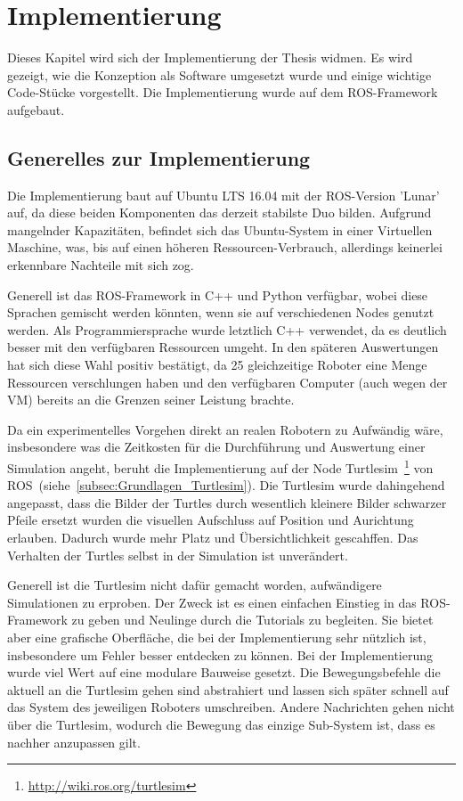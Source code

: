 \chapter{Implementierung}\label{ch:Implementierung}

Dieses Kapitel wird sich der Implementierung der Thesis widmen. Es wird gezeigt, wie die Konzeption als Software umgesetzt wurde und einige wichtige Code-Stücke vorgestellt. Die Implementierung wurde auf dem ROS-Framework aufgebaut.

\section{Generelles zur Implementierung}
Die Implementierung baut auf Ubuntu LTS 16.04 mit der ROS-Version 'Lunar' auf, da diese beiden Komponenten das derzeit stabilste Duo bilden. Aufgrund mangelnder Kapazitäten, befindet sich das Ubuntu-System in einer Virtuellen Maschine, was, bis auf einen höheren Ressourcen-Verbrauch, allerdings keinerlei erkennbare Nachteile mit sich zog.

Generell ist das ROS-Framework in C++ und Python verfügbar, wobei diese Sprachen gemischt werden könnten, wenn sie auf verschiedenen Nodes genutzt werden. Als Programmiersprache wurde letztlich C++ verwendet, da es deutlich besser mit den verfügbaren Ressourcen umgeht. In den späteren Auswertungen hat sich diese Wahl positiv bestätigt, da 25 gleichzeitige Roboter eine Menge Ressourcen verschlungen haben und den verfügbaren Computer (auch wegen der VM) bereits an die Grenzen seiner Leistung brachte.

Da ein experimentelles Vorgehen direkt an realen Robotern zu Aufwändig wäre, insbesondere was die Zeitkosten für die Durchführung und Auswertung einer Simulation angeht, beruht die Implementierung auf der Node Turtlesim~\footnote{\url{http://wiki.ros.org/turtlesim}} von ROS~(siehe~\autoref{subsec:Grundlagen_Turtlesim}). Die Turtlesim wurde dahingehend angepasst, dass die Bilder der Turtles durch wesentlich kleinere Bilder schwarzer Pfeile ersetzt wurden die visuellen Aufschluss auf Position und Aurichtung erlauben. Dadurch wurde mehr Platz und Übersichtlichkeit gescahffen. Das Verhalten der Turtles selbst in der Simulation ist unverändert.

Generell ist die Turtlesim nicht dafür gemacht worden, aufwändigere Simulationen zu erproben. Der Zweck ist es einen einfachen Einstieg in das ROS-Framework zu geben und Neulinge durch die Tutorials zu begleiten. Sie bietet aber eine grafische Oberfläche, die bei der Implementierung sehr nützlich ist, insbesondere um Fehler besser entdecken zu können.
Bei der Implementierung wurde viel Wert auf eine modulare Bauweise gesetzt. Die Bewegungsbefehle die aktuell an die Turtlesim gehen sind abstrahiert und lassen sich später schnell auf das System des jeweiligen Roboters umschreiben. Andere Nachrichten gehen nicht über die Turtlesim, wodurch die Bewegung das einzige Sub-System ist, dass es nachher anzupassen gilt.

